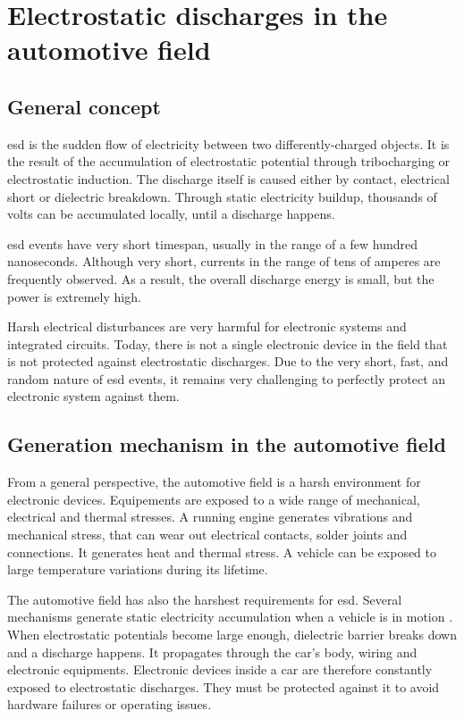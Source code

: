 \section{Electrostatic discharges in the automotive field}
\subsection{General concept}

\gls{esd} is the sudden flow of electricity between two differently-charged objects.
It is the result of the accumulation of electrostatic potential through tribocharging or electrostatic induction.
The discharge itself is caused either by contact, electrical short or dielectric breakdown.
Through static electricity buildup, thousands of volts can be accumulated locally, until a discharge happens.

\gls{esd} events have very short timespan, usually in the range of a few hundred nanoseconds.
Although very short, currents in the range of tens of amperes are frequently observed.
As a result, the overall discharge energy is small, but the power is extremely high.

Harsh electrical disturbances are very harmful for electronic systems and integrated circuits.
Today, there is not a single electronic device in the field that is not protected against electrostatic discharges.
Due to the very short, fast, and random nature of \gls{esd} events, it remains very challenging to perfectly protect an electronic system against them.

\subsection{Generation mechanism in the automotive field}

From a general perspective, the automotive field is a harsh environment for electronic devices.
Equipements are exposed to a wide range of mechanical, electrical and thermal stresses.
A running engine generates vibrations and mechanical stress, that can wear out electrical contacts, solder joints and connections.
It generates heat and thermal stress.
A vehicle can be exposed to large temperature variations during its lifetime.

The automotive field has also the harshest requirements for \gls{esd}.
Several mechanisms generate static electricity accumulation when a vehicle is in motion \cite{generationESDautomotive}.
When electrostatic potentials become large enough, dielectric barrier breaks down and a discharge happens.
It propagates through the car's body, wiring and electronic equipments.
Electronic devices inside a car are therefore constantly exposed to electrostatic discharges.
They must be protected against it to avoid hardware failures or operating issues.

